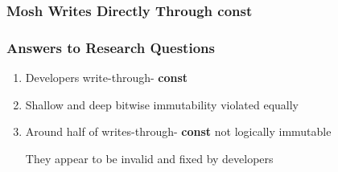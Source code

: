 \documentclass[aspectratio=169]{beamer}
\newcommand{\const}{{\color{blue} \bfseries \ttfamily const}}
\begin{document}
  \begin{frame}
    \frametitle{Mosh Writes Directly Through \const{}}
    \centering
    \large
  \end{frame}

  \begin{frame}
    \frametitle{Answers to Research Questions}
    \Large
    \begin{enumerate}
      \setlength\itemsep{0.5em}
      \item Developers write-through-\const{}
      \item Shallow and deep bitwise immutability violated equally
      \item Around half of writes-through-\const{} not logically immutable

            \vspace{1em}
            They appear to be invalid and fixed by developers
    \end{enumerate}
  \end{frame}
\end{document}

